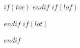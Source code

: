 \makeatletter
{}
\renewcommand{\@dotsep}{4.5}
\newcommand{\thesis@tocpagefont}{}
\patchcmd{\@dottedtocline}{\normalfont\normalcolor}{\normalfont\normalcolor\thesis@tocpagefont}{}{}
\newcommand{\thesis@boldtocline}[3]{%
  \let\thesis@dotsep\@dotsep
  \renewcommand{\@dotsep}{10000}%
  \renewcommand{\thesis@tocpagefont}{\bfseries}%
  #1{{\bfseries #2}}{#3}%
  \let\@dotsep\thesis@dotsep
  \renewcommand{\thesis@tocpagefont}{}}
\let\thesis@l@chapter\l@chapter
\renewcommand{\l@chapter}{\thesis@boldtocline\thesis@l@chapter}
\let\thesis@l@part\l@part
\renewcommand{\l@part}{\thesis@boldtocline\thesis@l@part}
\makeatother
$if(toc)$
\setcounter{tocdepth}{$toc-depth$}
\tableofcontents
$endif$
$if(lof)$
\listoffigures
$endif$
$if(lot)$
\listoftables
$endif$
\clearpage
{}
